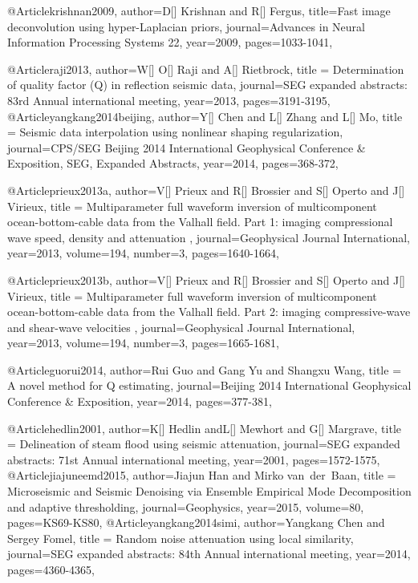 {@Article{krishnan2009,
  author={D[] Krishnan and R[] Fergus},
  title={Fast image deconvolution using hyper-Laplacian priors},
  journal={Advances in Neural Information Processing Systems 22},
  year=2009,
  pages={1033-1041},
}

@Article{raji2013,
  author={W[] O[] Raji and A[] Rietbrock},
  title = {Determination of quality factor (Q) in reflection seismic data},
  journal={SEG expanded abstracts: 83rd Annual international meeting},
  year=2013,
  pages={3191-3195},
}
@Article{yangkang2014beijing,
  author={Y[] Chen and L[] Zhang and L[] Mo},
  title = {Seismic data interpolation using nonlinear shaping regularization},
  journal={CPS/SEG Beijing 2014 International Geophysical Conference \& Exposition, SEG, Expanded Abstracts},
  year=2014,
  pages={368-372},
}


@Article{prieux2013a,
  author={V[] Prieux and R[] Brossier and S[] Operto and J[] Virieux},
  title = {Multiparameter full waveform inversion of multicomponent ocean-bottom-cable data from the Valhall field. {P}art 1: imaging compressional wave speed, density and attenuation },
  journal={Geophysical Journal International},
  year=2013,
  volume=194,
  number=3,
  pages={1640-1664},
}

@Article{prieux2013b,
  author={V[] Prieux and R[] Brossier and S[] Operto and J[] Virieux},
  title = {Multiparameter full waveform inversion of multicomponent ocean-bottom-cable data from the Valhall field. {P}art 2: imaging compressive-wave and shear-wave velocities },
  journal={Geophysical Journal International},
  year=2013,
  volume=194,
  number=3,
  pages={1665-1681},
}




@Article{guorui2014,
  author={Rui Guo and Gang Yu and Shangxu Wang},
  title = {A novel method for Q estimating},
  journal={Beijing 2014 International Geophysical Conference \& Exposition},
  year=2014,
  pages={377-381},
}

@Article{hedlin2001,
  author={K[] Hedlin andL[] Mewhort and G[] Margrave},
  title = {Delineation of steam flood using seismic attenuation},
  journal={SEG expanded abstracts: 71st Annual international meeting},
  year=2001,
  pages={1572-1575},
}
@Article{jiajuneemd2015,
  author={Jiajun Han and Mirko van~der~Baan},
  title = {Microseismic and Seismic Denoising via Ensemble Empirical Mode Decomposition and adaptive thresholding},
  journal={Geophysics},
  year=2015,
volume=80,
  pages={KS69-KS80},
}
@Article{yangkang2014simi,
  author={Yangkang Chen and Sergey Fomel},
  title = {Random noise attenuation using local similarity},
  journal={SEG expanded abstracts: 84th Annual international meeting},
  year=2014,
  pages={4360-4365},
}



}
